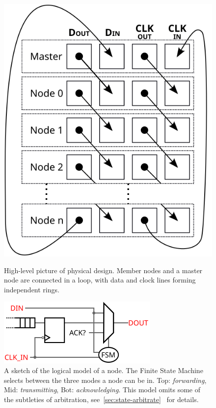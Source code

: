 \begin{figure}
  \begin{minipage}[b]{.48\linewidth}
    \centering
    \includegraphics[width=0.5\linewidth]{img/stacked_layers}
    \caption{High-level picture of \bus physical design. Member nodes and a
    master node are connected in a loop, with data and clock lines forming
    independent rings.
    }
    \label{fig:bus}
  \end{minipage}
  \hspace{1 em}
  \begin{minipage}[b]{.48\linewidth}
    \centering
    \includegraphics[width=\textwidth]{img/logical}
    \caption{A sketch of the logical model of a node. The Finite State Machine
  selects between the three modes a node can be in. Top: {\em forwarding}, Mid:
  {\em transmitting}, Bot: {\em acknowledging}. This model omits some of the
  subtleties of arbitration,
  see~\ref{sec:state-arbitrate}~ for details.
    }
    \label{fig:logical}
  \end{minipage}
\end{figure}

